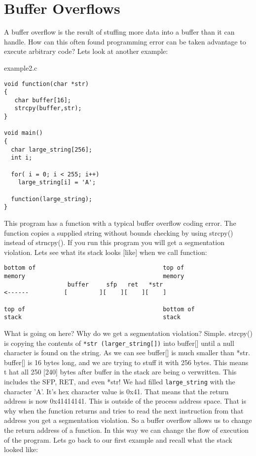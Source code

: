 \documentclass[10pt]{article}
\begin{document}
\section{Buffer Overflows}

A buffer overflow is the result of stuffing more data into a buffer than it can handle. How can this often found 
programming error can be taken advantage to execute arbitrary code? Lets look at another example:

example2.c 

\begin{lstlisting}
void function(char *str) 
{
   char buffer[16];
   strcpy(buffer,str);
}

void main() 
{
  char large_string[256];
  int i;

  for( i = 0; i < 255; i++)
    large_string[i] = 'A';

  function(large_string);
}
\end{lstlisting}

This program has a function with a typical buffer overflow coding error. The function copies a supplied string 
without bounds checking by using strcpy() instead of strncpy(). If you run this program you will get a segmentation violation. Lets see what its stack looks [like] when we call function: 

{\small
\begin{verbatim}
bottom of                                    top of
memory                                       memory
                  buffer     sfp   ret   *str
<------          [         ][    ][    ][    ]

top of                                       bottom of
stack                                        stack
\end{verbatim}
}
What is going on here? Why do we get a segmentation violation? Simple. strcpy() is copying the contents of  
\verb+*str (larger_string[])+ into buffer[] until a null character  is found on the string. As we can see buffer[] is much 
smaller than *str. buffer[] is 16 bytes long, and we are trying to stuff it with 256 bytes. This means t hat all 250 
[240] bytes after buffer in the stack are being o verwritten. This includes the SFP, RET, and even *str! We had 
filled \verb+large_string+ with the character 'A'. It's hex character value is 0x41. That means that the return 
address is now 0x41414141. This is outside of the process address space.  That is why when the function returns 
and tries to read the next instruction from that address you get a segmentation violation. So a buffer overflow 
allows us to change the return address of a function. In this way we can change the flow of execution of the 
program. Lets go back to our first example and recall what the stack looked like: 
\end{document}
